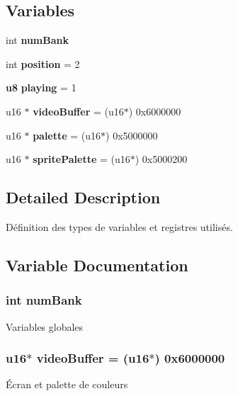 \subsection*{Variables}
\begin{DoxyCompactItemize}
\item 
int {\bf numBank}
\item 
int {\bfseries position} = 2\label{main_8h_a401e942526aac47cef94f478182486e7}

\item 
{\bf u8} {\bfseries playing} = 1\label{main_8h_abc0b00c04c93ec14236edcf27cc3e544}

\item 
u16 $\ast$ {\bf videoBuffer} = (u16$\ast$) 0x6000000
\item 
u16 $\ast$ {\bfseries palette} = (u16$\ast$) 0x5000000\label{main_8h_aef1309f61f773746f03d13f69d6ca3e6}

\item 
u16 $\ast$ {\bfseries spritePalette} = (u16$\ast$) 0x5000200\label{main_8h_ac1da00969ff36d611bc5611a54ccf247}

\end{DoxyCompactItemize}


\subsection{Detailed Description}
Définition des types de variables et registres utilisés. 

\subsection{Variable Documentation}
\subsubsection[{numBank}]{\setlength{\rightskip}{0pt plus 5cm}int {\bf numBank}}\label{main_8h_aefb5ba1b2f7be4a3493e5f6a49563e09}
Variables globales 
\subsubsection[{videoBuffer}]{\setlength{\rightskip}{0pt plus 5cm}u16$\ast$ {\bf videoBuffer} = (u16$\ast$) 0x6000000}\label{main_8h_a0a7c0ba1591b9aca7600d5641ef485f4}
Écran et palette de couleurs 